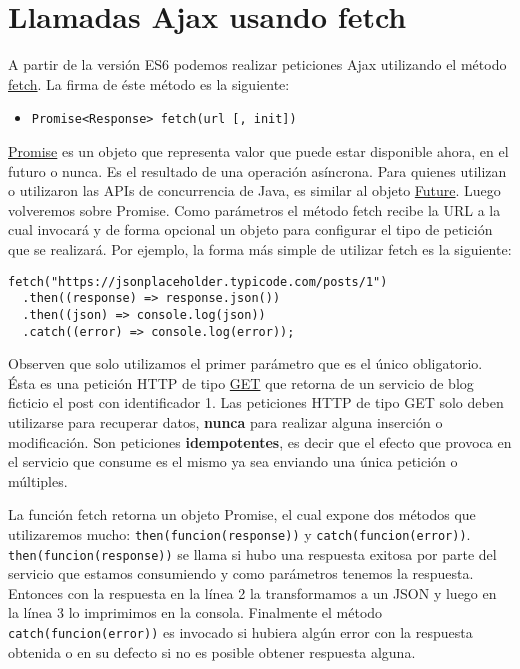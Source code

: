 \documentclass[a4paper, oneside, titlepage, 12pt]{paper}
\begin{document}
\section{Llamadas Ajax usando fetch}

A partir de la versión ES6 podemos realizar peticiones Ajax utilizando el método \href{https://developer.mozilla.org/es/docs/Web/API/WindowOrWorkerGlobalScope/fetch}{fetch}. La firma de éste método es la siguiente:

\begin{itemize}
 \item \texttt{Promise<Response> fetch(url [, init])} 
\end{itemize}

\href{https://developer.mozilla.org/es/docs/Web/JavaScript/Reference/Global_Objects/Promise}{Promise} es un objeto que representa valor que puede estar disponible ahora, en el futuro o nunca. Es el resultado de una operación asíncrona. Para quienes utilizan o utilizaron las APIs de concurrencia de Java, es similar al objeto \href{https://docs.oracle.com/javase/7/docs/api/java/util/concurrent/Future.html}{Future}. Luego volveremos sobre Promise. Como parámetros el método fetch recibe la URL a la cual invocará y de forma opcional un objeto para configurar el tipo de petición que se realizará. Por ejemplo, la forma más simple de utilizar fetch es la siguiente:

\begin{verbatim}
fetch("https://jsonplaceholder.typicode.com/posts/1")
  .then((response) => response.json())
  .then((json) => console.log(json))
  .catch((error) => console.log(error));
\end{verbatim}

Observen que solo utilizamos el primer parámetro que es el único obligatorio. Ésta es una petición HTTP de tipo \href{https://developer.mozilla.org/es/docs/Web/HTTP/Methods/GET}{GET} que retorna de un servicio de blog ficticio el post con identificador 1. Las peticiones HTTP de tipo GET solo deben utilizarse para recuperar datos, \textbf{nunca} para realizar alguna inserción o modificación. Son peticiones \textbf{idempotentes}, es decir que el efecto que provoca en el servicio que consume es el mismo ya sea enviando una única petición o múltiples.
\newline

La función fetch retorna un objeto Promise, el cual expone dos métodos que utilizaremos mucho: \texttt{then(funcion(response))} y \texttt{catch(funcion(error))}. \texttt{then(funcion(response))} se llama si hubo una respuesta exitosa por parte del servicio que estamos consumiendo y como parámetros tenemos la respuesta. Entonces con la respuesta en la línea 2 la transformamos a un JSON y luego en la línea 3 lo imprimimos en la consola. Finalmente el método \texttt{catch(funcion(error))} es invocado si hubiera algún error con la respuesta obtenida o en su defecto si no es posible obtener respuesta alguna.
\newline
\end{document}
